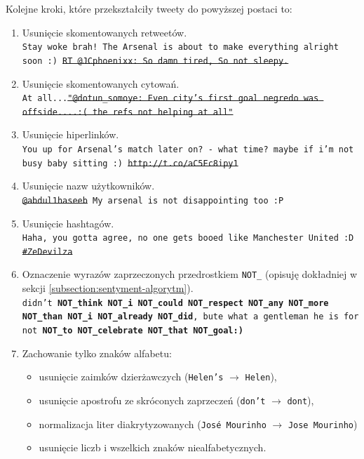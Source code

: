 Kolejne kroki, które przekształciły tweety do powyższej postaci to:
\begin{enumerate}
  \item Usunięcie skomentowanych retweetów.\\
  \texttt{Stay woke brah! The Arsenal is about to make everything
  alright soon :) \sout{RT @JCphoenixx: So damn tired, So not sleepy.}}
  
  \item Usunięcie skomentowanych cytowań. \\
  \texttt{At all...\sout{"@dotun\_somoye: Even city's first goal
  negredo was offside....:( the refs not helping at all"} }
  
  \item Usunięcie hiperlinków.\\
  \texttt{You up for Arsenal's match later on? - what time? maybe if i'm not
  busy baby sitting :) \sout{http://t.co/aC5Ec8ipy1}}
 
  
  \item Usunięcie nazw użytkowników.\\
  \texttt{\sout{@abdul1haseeb} My arsenal is not disappointing too :P}
  
  
  \item Usunięcie hashtagów. \\
  \texttt{Haha, you gotta agree, no one gets booed like Manchester United :D
  \sout{\#ZeDevilza}}
  
  
  \item Oznaczenie wyrazów zaprzeczonych przedrostkiem \texttt{NOT\_} (opisuję
  dokładniej w sekcji \ref{subsection:sentyment-algorytm}). \\
  \texttt{didn't \textbf{NOT\_think NOT\_i NOT\_could NOT\_respect NOT\_any 
  NOT\_more NOT\_than NOT\_i NOT\_already NOT\_did}, bute what a gentleman he 
  is for not \textbf{NOT\_to NOT\_celebrate NOT\_that NOT\_goal:)}}

 \item Zachowanie tylko znaków alfabetu:
  	\begin{itemize}
  		\item usunięcie zaimków dzierżawczych (\texttt{Helen's} $\to$ \texttt{Helen}),
  		\item usunięcie apostrofu ze skróconych zaprzeczeń (\texttt{don't} $\to$ \texttt{dont}),
  		\item normalizacja liter diakrytyzowanych (\texttt{José Mourinho} $\to$ \texttt{Jose
  		Mourinho})
  		\item usunięcie liczb i wszelkich znaków niealfabetycznych.
	\end{itemize}


\end{enumerate}
